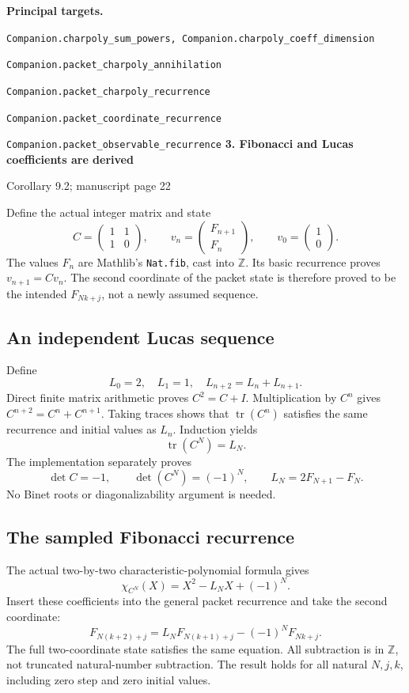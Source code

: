 \documentclass[11pt]{article}
\newcommand{\Z}{\mathbb Z}\newcommand{\N}{\mathbb N}\newcommand{\Q}{\mathbb Q}
\newcommand{\target}[1]{{\footnotesize\texttt{#1}}}
\newcommand{\pageheading}[2]{{\Large\bfseries\color{ink}#1}\par{\small #2}\par\medskip}
\begin{document}
\textbf{Principal targets.}\par
\target{Companion.charpoly\_sum\_powers, Companion.charpoly\_coeff\_dimension}\par
\target{Companion.packet\_charpoly\_annihilation}\par
\target{Companion.packet\_charpoly\_recurrence}\par
\target{Companion.packet\_coordinate\_recurrence}\par
\target{Companion.packet\_observable\_recurrence}
\newpage
\pageheading{3. Fibonacci and Lucas coefficients are derived}{Corollary 9.2; manuscript page 22}
Define the actual integer matrix and state
\[
 C=\begin{pmatrix}1&1\\1&0\end{pmatrix},
 \qquad v_n=\begin{pmatrix}F_{n+1}\\F_n\end{pmatrix},
 \qquad v_0=\begin{pmatrix}1\\0\end{pmatrix}.
\]
The values $F_n$ are Mathlib's \texttt{Nat.fib}, cast into $\Z$. Its basic recurrence proves $v_{n+1}=Cv_n$. The second coordinate of the packet state is therefore proved to be the intended $F_{Nk+j}$, not a newly assumed sequence.

\subsection*{An independent Lucas sequence}
Define
\[
 L_0=2,\quad L_1=1,\quad L_{n+2}=L_n+L_{n+1}.
\]
Direct finite matrix arithmetic proves $C^2=C+I$. Multiplication by $C^n$ gives $C^{n+2}=C^n+C^{n+1}$. Taking traces shows that $\operatorname{tr}(C^n)$ satisfies the same recurrence and initial values as $L_n$. Induction yields
\[
 \boxed{\operatorname{tr}(C^N)=L_N.}
\]
The implementation separately proves
\[
 \det C=-1,\qquad \det(C^N)=(-1)^N,
 \qquad L_N=2F_{N+1}-F_N.
\]
No Binet roots or diagonalizability argument is needed.

\subsection*{The sampled Fibonacci recurrence}
The actual two-by-two characteristic-polynomial formula gives
\[
 \chi_{C^N}(X)=X^2-L_NX+(-1)^N.
\]
Insert these coefficients into the general packet recurrence and take the second coordinate:
\[
 \boxed{F_{N(k+2)+j}=L_NF_{N(k+1)+j}-(-1)^NF_{Nk+j}.}
\]
The full two-coordinate state satisfies the same equation. All subtraction is in $\Z$, not truncated natural-number subtraction. The result holds for all natural $N,j,k$, including zero step and zero initial values.
\end{document}
